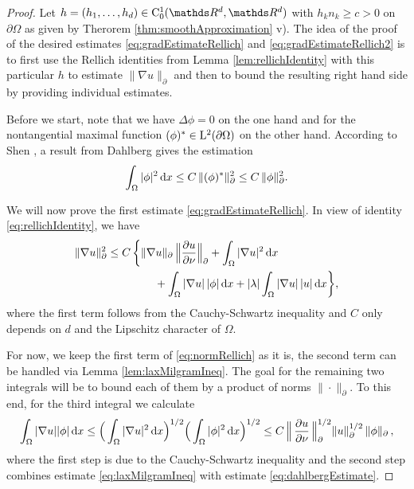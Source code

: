 \begin{proof}
  Let $h = (h_1, \dots, h_d) \in \CC_0^1(\R^d, \R^d)$ with $h_k n_k \geq c > 0$ on $\partial \Omega$ as given by Therorem \ref{thm:smoothApproximation} v). 
  The idea of the proof of the desired estimates \eqref{eq:gradEstimateRellich} and \eqref{eq:gradEstimateRellich2} is to first use the Rellich identities from Lemma \ref{lem:rellichIdentity} with this particular $h$ to estimate $\|\nabla u\|_\partial$ and then to bound the resulting right hand side by providing individual estimates.

  Before we start, note that we have $\Delta \phi = 0$ on the one hand and for the nontangential maximal function $(\phi)^* \in \mathrm{L}^2(\partial\Omega)$ on the other hand. According to Shen \cite[p. 410]{Shen2012}, a result from Dahlberg \cite{dahlberg77} gives the estimation
  \begin{align}
    \label{eq:dahlbergEstimate}
    \int_\Omega |\phi|^2 \, {\operatorname{d}\!{x}} \leq C \, \|(\phi)^* \|_\partial^2 \leq C\, \|\phi\|_\partial^2.
  \end{align}

  We will now prove the first estimate \eqref{eq:gradEstimateRellich}.
  In view of identity \eqref{eq:rellichIdentity}, we have
  \begin{align}
    \label{eq:normRellich}
    \begin{alignedat}{1}
    \|\nabla u\|_\partial^2
    &\leq C \, \bigg\{ \|\nabla u\|_\partial \, \Big\| \frac{\partial u}{\partial \nu} \Big\|_\partial + \int_\Omega |\nabla u|^2 \, {\operatorname{d}\!{x}} \\
    &\hspace{1.5cm}+ \int_\Omega |\nabla u| \, |\phi| \, {\operatorname{d}\!{x}} + |\lambda| \int_\Omega |\nabla u|\, |u| \, {\operatorname{d}\!{x}} \bigg\},
    \end{alignedat}
  \end{align}
  where the first term follows from the Cauchy-Schwartz inequality and $C$ only depends on $d$ and the Lipschitz character of $\Omega$.

  For now, we keep the first term of \eqref{eq:normRellich} as it is, the second term can be handled via Lemma \ref{lem:laxMilgramIneq}. 
  The goal for the remaining two integrals will be to bound each of them by a product of norms $\|\cdot\|_\partial$.
To this end, for the third integral we calculate
  \begin{align}
    \int_\Omega |\nabla u| |\phi| \, {\operatorname{d}\!{x}}
    \leq \Big( \int_\Omega |\nabla u|^2 \, {\operatorname{d}\!{x}} \Big)^{1/2} \Big( \int_\Omega |\phi|^2 \, {\operatorname{d}\!{x}} \Big)^{1/2}
    \leq C \, \Big\| \, \frac{\partial u}{\partial \nu}\, \Big\|_\partial^{1/2} \|u\|_\partial^{1/2} \, \|\phi\|_\partial\,, \label{eq:nablaPhi}
  \end{align}
  where the first step is due to the Cauchy-Schwartz inequality and the second step combines estimate \eqref{eq:laxMilgramIneq} with estimate \eqref{eq:dahlbergEstimate}.


\end{proof}
